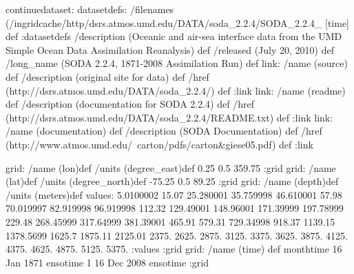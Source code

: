 \begin{ingrid}
continuedataset:
datasetdefs:
/filenames
{
(/ingridcache/http/dsrs.atmos.umd.edu/DATA/soda_2.2.4/SODA_2.2.4_%
[time]
} def
:datasetdefs
/description (Oceanic and air-sea interface data from the UMD Simple Ocean Data Assimilation Reanalysis) def
 /released (July 20, 2010) def
 /long_name (SODA 2.2.4, 1871-2008 Assimilation Run) def
link:
/name (source) def
/description (original site for data) def
/href (http://dsrs.atmos.umd.edu/DATA/soda_2.2.4/) def
:link
link:
/name (readme) def
/description (documentation for SODA 2.2.4) def
/href (http://dsrs.atmos.umd.edu/DATA/soda_2.2.4/README.txt) def
:link
link:
/name (documentation) def
/description (SODA Documentation) def
/href (http://www.atmos.umd.edu/~carton/pdfs/carton&giese05.pdf) def
:link

grid:
/name (lon)def
/units (degree_east)def
 0.25 0.5 359.75
:grid
grid:
/name (lat)def
/units (degree_north)def
 -75.25 0.5 89.25
:grid
grid:
/name (depth)def
/units (meters)def
values: 5.0100002 15.07 25.280001 35.759998 46.610001 57.98 70.019997 82.919998 96.919998 112.32 129.49001 148.96001 171.39999 197.78999 229.48 268.45999 317.64999 381.39001 465.91 579.31 729.34998 918.37 1139.15 1378.5699 1625.7 1875.11 2125.01 2375. 2625. 2875. 3125. 3375. 3625. 3875. 4125. 4375. 4625. 4875. 5125. 5375. :values
:grid
grid:
/name (time) def
monthtime
16 Jan 1871 ensotime
1
16 Dec 2008 ensotime
:grid
\end{ingrid}
